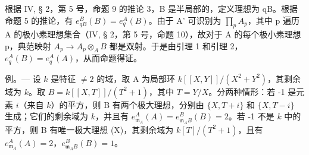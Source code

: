 根据 IV, § 2，第 5 号，命题 9 的推论 3，B 是半局部的，定义理想为 qB。根据命题 5 的推论，有 \(e_{qB}^{B}(B) = e_{q}^{A}(B)\)。由于 A' 可识别为 \(\prod_{p} A_p\)，其中 p 遍历 A 的极小素理想集合（IV, § 2，第 5 号，命题 10），故对于 A 的每个极小素理想 p，典范映射 \(A_{p} \to A_{p} \otimes_{A} B\) 都是双射。于是由引理 1 和引理 2，\(e_{q}^{A}(B) = e_{q}^{A}(A)\)，从而命题得证。

例。--- 设 \(k\) 是特征 \(\neq 2\) 的域，取 A 为局部环 \(k[[X, Y]]/(X^{2} + Y^{2})\)，其剩余域为 \(k\)。取 \(B = k[[X, T]]/(T^{2} + 1)\)，其中 \(T = Y/X\)。分两种情形：若 -1 是元素 \(i\)（来自 \(k\)）的平方，则 B 有两个极大理想，分别由 \(\{X, T + i\}\) 和 \(\{X, T - i\}\) 生成；它们的剩余域为 \(k\)，并且有 \(e_{\mathfrak{m}_{A}}^{A}(A) = e_{\mathfrak{m}_{A}B}^{B}(B) = 2\)。若 -1 不是 \(k\) 中的平方，则 B 有唯一极大理想 (X)，其剩余域为 \(k[T]/(T^{2} + 1)\)，且有 \(e_{\mathfrak{m}_{A}}^{A}(A) = 2\)，\(e_{\mathfrak{m}_{A}B}^{B}(B) = 1\)。

